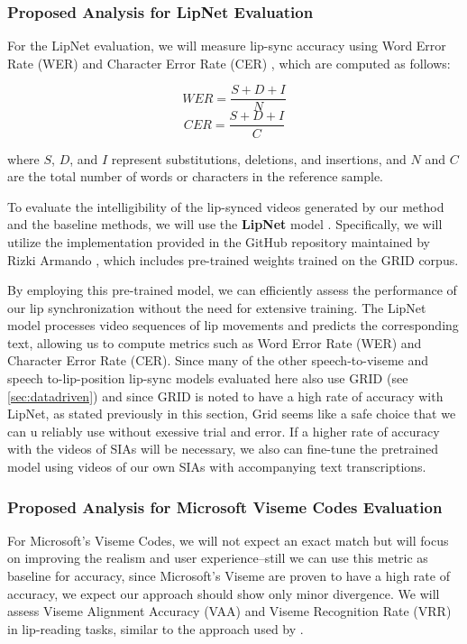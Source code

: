 \documentclass[12pt]{article}
\begin{document}
\subsubsection{Proposed Analysis for LipNet Evaluation}

For the LipNet evaluation, we will measure lip-sync accuracy using Word Error Rate (WER) and Character Error Rate (CER) \cite{KlakowTestingQ}, which are computed as follows:

\[
WER = \frac{S + D + I}{N}
\]
\[
CER = \frac{S + D + I}{C}
\]

where $S$, $D$, and $I$ represent substitutions, deletions, and insertions, and $N$ and $C$ are the total number of words or characters in the reference sample.

To evaluate the intelligibility of the lip-synced videos generated by our method and the baseline methods, we will use the \textbf{LipNet} model \cite{Assael2016LipNet}. Specifically, we will utilize the implementation provided in the GitHub repository maintained by Rizki Armando \cite{RizkiLipNetRepo}, which includes pre-trained weights trained on the GRID corpus.

By employing this pre-trained model, we can efficiently assess the performance of our lip synchronization without the need for extensive training. The LipNet model processes video sequences of lip movements and predicts the corresponding text, allowing us to compute metrics such as Word Error Rate (WER) and Character Error Rate (CER). Since many of the other speech-to-viseme and speech to-lip-position lip-sync models evaluated here \cite{Zhou2018visemenet, Edwards2020jali-driven} also use GRID\cite{Alghamdi2018AViews} (see \ref{sec:datadriven}) and since GRID is noted to have a high rate of accuracy with LipNet, as stated previously in this section, Grid seems like a safe choice that we can u reliably use without exessive trial and error.  If a higher rate of accuracy with the videos of SIAs will be necessary, we also can fine-tune the pretrained model using videos of our own SIAs with accompanying text transcriptions.

\subsubsection{Proposed Analysis for Microsoft Viseme Codes Evaluation}

For Microsoft’s Viseme Codes, we will not expect an exact match but will focus on improving the realism and user experience--still we can use this metric as baseline for accuracy, since Microsoft's Viseme are proven to have a high rate of accuracy, we expect our approach should show only minor divergence. We will assess Viseme Alignment Accuracy (VAA) and Viseme Recognition Rate (VRR) in lip-reading tasks, similar to the approach used by \cite{Santos2023ALipreading}.
\end{document}
